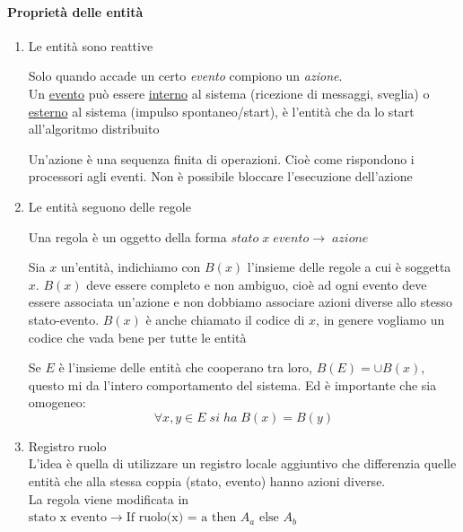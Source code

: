 \paragraph{Proprietà delle entità}
\begin{enumerate}
    \item Le entità sono reattive
    
    Solo quando accade un certo \textit{evento} compiono un \textit{azione}.\\
    Un \uline{evento} può essere \uline{interno} al sistema (ricezione di messaggi, sveglia) o \uline{esterno} al sistema (impulso spontaneo/start), è l'entità che da lo start all'algoritmo distribuito
    
    Un'azione è una sequenza finita di operazioni. Cioè come rispondono i processori agli eventi. Non è possibile bloccare l'esecuzione dell'azione
    \item Le entità seguono delle regole
    \begin{definizione}
        Una regola è un oggetto della forma $stato\;x\;evento\rightarrow\;azione$
    \end{definizione}
    \begin{definizione}
        Sia $x$ un'entità, indichiamo con $B(x)$ l'insieme delle regole a cui è soggetta $x$. $B(x)$ deve essere completo e non ambiguo, cioè ad ogni evento deve essere associata un'azione e non dobbiamo associare azioni diverse allo stesso stato-evento. $B(x)$ è anche chiamato il codice di $x$, in genere vogliamo un codice che vada bene per tutte le entità

        Se $E$ è l'insieme delle entità che cooperano tra loro, $B(E) = \cup B(x)$, questo mi da l'intero comportamento del sistema. Ed è importante che sia omogeneo:
        $$\forall x,y \in E \;si\;ha\; B(x)=B(y)$$
    \end{definizione}
    \item Registro ruolo\\
    L'idea è quella di utilizzare un registro locale aggiuntivo che differenzia quelle entità che alla stessa coppia (stato, evento) hanno azioni diverse.\\
    La regola viene modificata in $\text{stato x evento} \rightarrow \text{If ruolo(x) = a then } A_a \text{ else } A_b$
\end{enumerate}

